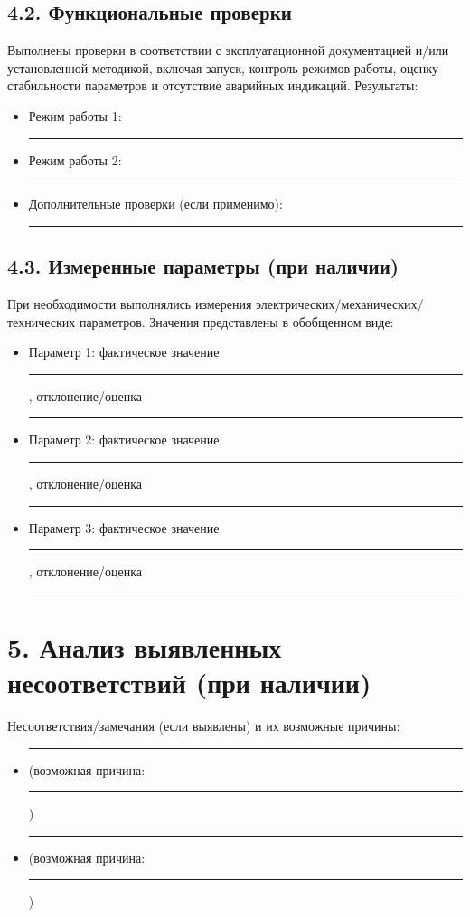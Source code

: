 \documentclass[12pt]{article}
\begin{document}
\subsection*{4.2. Функциональные проверки}
\noindent Выполнены проверки в соответствии с эксплуатационной документацией и/или установленной методикой, включая запуск, контроль режимов работы, оценку стабильности параметров и отсутствие аварийных индикаций. Результаты:
\begin{itemize}
    \item Режим работы 1: \rule{0.85\linewidth}{0.4pt}
    \item Режим работы 2: \rule{0.85\linewidth}{0.4pt}
    \item Дополнительные проверки (если применимо): \rule{0.85\linewidth}{0.4pt}
\end{itemize}

\subsection*{4.3. Измеренные параметры (при наличии)}
\noindent При необходимости выполнялись измерения электрических/механических/технических параметров. Значения представлены в обобщенном виде:
\begin{itemize}
    \item Параметр 1: фактическое значение \rule{0.75\linewidth}{0.4pt}, отклонение/оценка \rule{0.75\linewidth}{0.4pt}
    \item Параметр 2: фактическое значение \rule{0.75\linewidth}{0.4pt}, отклонение/оценка \rule{0.75\linewidth}{0.4pt}
    \item Параметр 3: фактическое значение \rule{0.75\linewidth}{0.4pt}, отклонение/оценка \rule{0.75\linewidth}{0.4pt}
\end{itemize}

\vspace{0.5cm}

\section*{5. Анализ выявленных несоответствий (при наличии)}
\noindent Несоответствия/замечания (если выявлены) и их возможные причины:
\begin{itemize}
    \item \rule{0.95\linewidth}{0.4pt} (возможная причина: \rule{0.6\linewidth}{0.4pt})
    \item \rule{0.95\linewidth}{0.4pt} (возможная причина: \rule{0.6\linewidth}{0.4pt})
\end{itemize}
\end{document}
